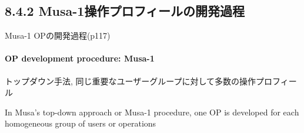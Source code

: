 \subsection{8.4.2 Musa-1操作プロフィールの開発過程}
\begin{frame}{Musa-1 OPの開発過程(p117)}
\framesubtitle{OP development procedure: Musa-1}
\begin{definationfc}[Musa-1]
トップダウン手法, 同じ重要なユーザーグループに対して多数の操作プロフィール

In Musa’s top-down approach or Musa-1 procedure,
one OP is developed for each homogeneous group of users or operations 
\end{definationfc}


\end{frame}
